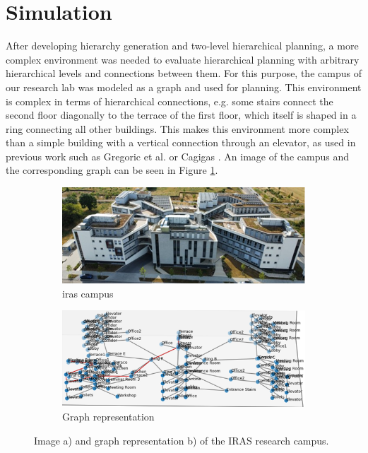 \section{Simulation}
\label{sec:simulation}
After developing hierarchy generation and two-level hierarchical planning, a more complex environment was needed to evaluate hierarchical planning with arbitrary hierarchical levels and connections between them. For this purpose, the campus of our research lab was modeled as a graph and used for planning. This environment is complex in terms of hierarchical connections, e.g. some stairs connect the second floor diagonally to the terrace of the first floor, which itself is shaped in a ring connecting all other buildings. This makes this environment more complex than a simple building with a vertical connection through an elevator, as used in previous work such as Gregoric et al. \cite{gregoric_autonomous_2022} or Cagigas \cite{cagigas_hierarchical_2005}. An image of the campus and the corresponding graph can be seen in Figure \ref{fig:ltc_rendering}.

\begin{figure}[h]
    \captionsetup[subfigure]{justification=centering}
    \centering
    \begin{subfigure}{.5\textwidth}
      \centering
      \includegraphics[width=\textwidth]{figures/30_methods/ltc_real.jpg}
      \caption{\gls{iras} campus}
    \end{subfigure}%
    \begin{subfigure}{.5\textwidth}
      \centering
      \includegraphics[width=\textwidth]{figures/30_methods/ltc_graph.png}
      \caption{Graph representation}
    \end{subfigure}
    \captionsetup{justification=centering}
    \caption[Image and graph representation of the IRAS research campus]{Image a) and graph representation b) of the IRAS research campus.}
    \label{fig:ltc_rendering}
\end{figure}

